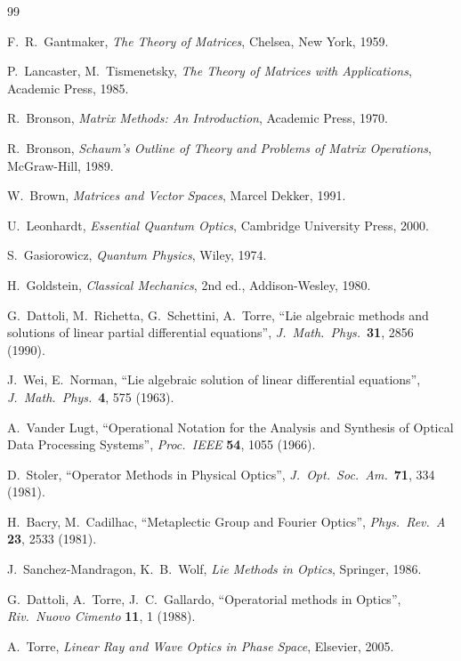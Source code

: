 \begin{thebibliography}{99}

 F.~R.\ Gantmaker, \emph{The Theory of Matrices}, Chelsea, New York, 1959.

 P.~Lancaster, M.~Tismenetsky, \emph{The Theory of Matrices with Applications}, Academic Press, 1985.

 R.~Bronson, \emph{Matrix Methods: An Introduction}, Academic Press, 1970.

 R.~Bronson, \emph{Schaum's Outline of Theory and Problems of Matrix Operations}, McGraw-Hill, 1989.

 W.~Brown, \emph{Matrices and Vector Spaces}, Marcel Dekker, 1991.

 U.~Leonhardt, \emph{Essential Quantum Optics}, Cambridge University Press, 2000.

 S.~Gasiorowicz, \emph{Quantum Physics}, Wiley, 1974.

 H.~Goldstein, \emph{Classical Mechanics}, 2nd ed., Addison-Wesley, 1980.

 G.~Dattoli, M.~Richetta, G.~Schettini, A.~Torre,
``Lie algebraic methods and solutions of linear partial differential equations'', \emph{J.\ Math.\ Phys.}\ \textbf{31}, 2856 (1990).

 J.~Wei, E.~Norman,
``Lie algebraic solution of linear differential equations'', \emph{J.\ Math.\ Phys.}\ \textbf{4}, 575 (1963).

 A.~Vander Lugt,
``Operational Notation for the Analysis and Synthesis of Optical Data Processing Systems'', \emph{Proc.\ IEEE} \textbf{54}, 1055 (1966).

 D.~Stoler, ``Operator Methods in Physical Optics'', \emph{J.\ Opt.\ Soc.\ Am.}\ \textbf{71}, 334 (1981).

 H.~Bacry, M.~Cadilhac, ``Metaplectic Group and Fourier Optics'', \emph{Phys.\ Rev.\ A} \textbf{23}, 2533 (1981).

 J.~Sanchez-Mandragon, K.~B.~Wolf, \emph{Lie Methods in Optics}, Springer, 1986.

 G.~Dattoli, A.~Torre, J.~C.~Gallardo,
``Operatorial methods in Optics'', \emph{Riv.\ Nuovo Cimento} \textbf{11}, 1 (1988).

 A.~Torre, \emph{Linear Ray and Wave Optics in Phase Space}, Elsevier, 2005.


\end{thebibliography}
